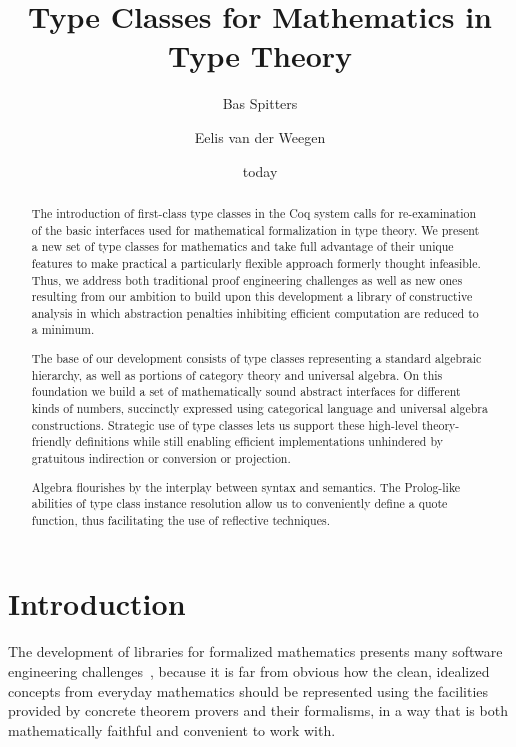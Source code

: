 \documentclass[a4paper,10pt,runningheads]{llncs}
\begin{document}
\title{Type Classes for Mathematics in Type Theory}
\author{Bas Spitters \and Eelis van der Weegen} %
\date{today}
\maketitle
\begin{abstract}
The introduction of first-class type classes in the Coq system calls for re-examination of the basic interfaces used for mathematical formalization in type theory.
We present a new set of type classes for mathematics and take full advantage of their unique features to make practical a particularly flexible approach formerly thought infeasible. Thus, we address both traditional proof engineering challenges as well as new ones resulting from our ambition to build upon this development a library of constructive analysis in which abstraction penalties inhibiting efficient computation are reduced to a minimum.

The base of our development consists of type classes representing a standard algebraic hierarchy, as well as portions of category theory and universal algebra. On this foundation we build a set of mathematically sound abstract interfaces for different kinds of numbers, succinctly expressed using categorical language and universal algebra constructions. Strategic use of type classes lets us support these high-level theory-friendly definitions while still enabling efficient implementations unhindered by gratuitous indirection or conversion or projection.

Algebra flourishes by the interplay between syntax and semantics. The Prolog-like abilities of type class instance resolution allow us to conveniently define a quote function, thus facilitating the use of reflective techniques.
\end{abstract}

\section{Introduction}
The development of libraries for formalized mathematics presents many software engineering challenges~\cite{C-corn,DBLP:conf/types/HaftmannW08}, because it is far from obvious how the clean, idealized concepts from everyday mathematics should be represented using the facilities provided by concrete theorem provers and their formalisms, in a way that is both mathematically faithful and convenient to work with.
\end{document}
